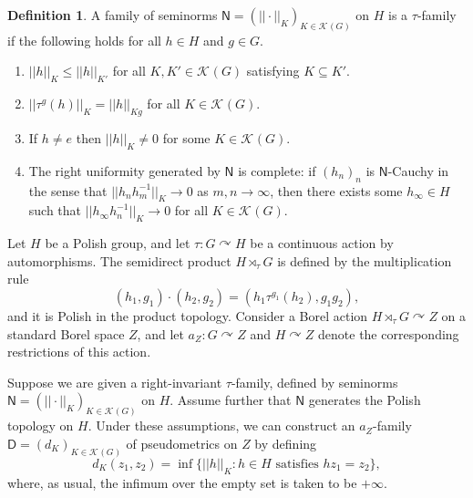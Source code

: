 \documentclass[12pt]{paper}
\numberwithin{equation}{section}
\theoremstyle{plain}
\theoremstyle{definition}
\newtheorem{definition}[theorem]{Definition}
\newcommand{\vietoris}[2][]{\mathcal{K}_{#1}(#2)}
\newcommand{\unifm}{\mathsf{D}}
\newcommand{\unifn}{\mathsf{N}}
\newcommand{\acts}{\curvearrowright}
\newcommand{\norm}[1]{||#1||}
\begin{document}
\begin{definition}
  \label{def:U-family-seminorms}
  A family of seminorms \(\unifn = (\norm{\cdot}_{K})_{K \in \vietoris{G}}\) on \(H\) is a
  \(\tau\)-family if the following holds for all \(h \in H\) and \(g \in G\).
  \begin{enumerate}[leftmargin=1cm, label={\sf \arabic*}., ref={\sf \arabic*}]
  \item\label{item:semi-unif-monotone} \(\norm{h}_{K} \le \norm{h}_{K'}\) for all
    \(K, K' \in \vietoris{G}\) satisfying \(K \subseteq K'\).
  \item\label{item:semi-unif-shift} \(\norm{\tau^{g}(h)}_{K} = \norm{h}_{Kg}\) for all
    \(K \in \vietoris{G}\).
  \item\label{item:semi-unif-hausdorff} If \(h \ne e\) then \(\norm{h}_{K} \ne 0\) for some
    \(K \in \vietoris{G}\).
  \item\label{item:semi-unif-complete} The right uniformity generated by \( \unifn \) is complete:
    if \((h_{n})_{n}\) is \(\unifn\)-Cauchy in the sense that \(\norm{h_{n}h_{m}^{-1}}_{K} \to 0\)
    as \(m,n \to \infty\), then there exists some \(h_{\infty} \in H\) such that
    \(\norm{h_{\infty}h^{-1}_{n}}_{K} \to 0 \) for all \(K \in \vietoris{G}\).
  \end{enumerate}
\end{definition}


Let \(H\) be a Polish group, and let \(\tau: G \acts H\) be a continuous action by
automorphisms. The semidirect product \(H \rtimes_{\tau} G\) is defined by the multiplication rule
\begin{equation}
  \label{eq:semidirect-product}
  (h_{1}, g_{1}) \cdot (h_{2}, g_{2}) = (h_{1} \tau^{g_{1}}(h_{2}), g_{1}g_{2}),
\end{equation}
and it is Polish in the product topology. Consider a Borel action \(H \rtimes_{\tau} G \acts Z\) on
a standard Borel space \(Z\), and let \(a_{Z}: G \acts Z\) and \(H \acts Z\) denote the
corresponding restrictions of this action.

Suppose we are given a right-invariant \(\tau\)-family, defined by seminorms
\(\unifn = (\norm{\cdot}_{K})_{K \in \vietoris{G}}\) on \(H\). Assume further that \(\unifn\)
generates the Polish topology on \(H\). Under these assumptions, we can construct an
\(a_{Z}\)-family \(\unifm = (d_{K})_{K \in \vietoris{G}}\) of pseudometrics on \(Z\) by defining
\[
  d_{K}(z_{1}, z_{2}) = \inf\bigl\{\norm{h}_{K} : h \in H \text{ satisfies } hz_{1} = z_{2}\bigr\},
\]
where, as usual, the infimum over the empty set is taken to be \(+\infty\).
\end{document}
